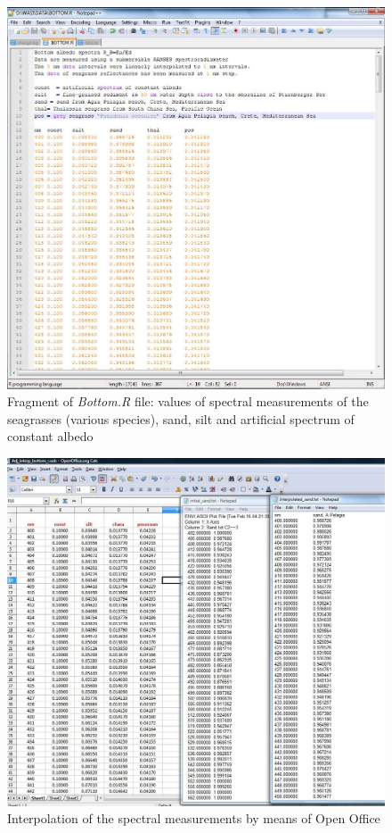 \documentclass[10pt, a4paper]{article}
\begin{document}
\begin{appendices}
\begin{figure}[H]
	\centering
	\includegraphics[scale=0.4]{Fig-28.jpg}
	\caption{Fragment of \textit{Bottom.R} file: values of spectral measurements of the
		seagrasses (various species), sand, silt and artificial spectrum of constant albedo}
	\label{fig:A.9}
\end{figure}
\pagebreak

\begin{figure}[H]
	\begin{center}
		\includegraphics[scale=0.35]{Interpolation.jpg}
		\caption{Interpolation of the spectral measurements by means of Open Office}
		\label{fig:A.10}
	\end{center}
\end{figure}
\pagebreak


\end{appendices}
\end{document}
